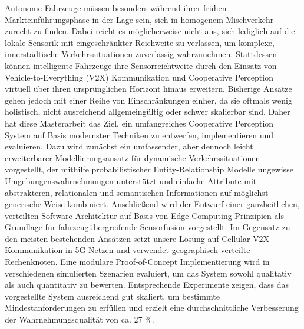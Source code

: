 Autonome Fahrzeuge müssen besonders während ihrer frühen Markteinführungsphase in der Lage sein, sich in homogenem Mischverkehr zurecht zu finden. Dabei reicht es möglicherweise nicht aus, sich lediglich auf die lokale Sensorik mit eingeschränkter Reichweite zu verlassen, um komplexe, innerstädtische Verkehrssituationen zuverlässig wahrzunehmen. Stattdessen können intelligente Fahrzeuge ihre Sensorreichtweite durch den Einsatz von Vehicle-to-Everything (V2X) Kommunikation und Cooperative Perception virtuell über ihren ursprünglichen Horizont hinaus erweitern. Bisherige Ansätze gehen jedoch mit einer Reihe von Einschränkungen einher, da sie oftmals wenig holistisch, nicht ausreichend allgemeingültig oder schwer skalierbar sind. Daher hat diese Masterarbeit das Ziel, ein umfangreiches Cooperative Perception System auf Basis modernster Techniken zu entwerfen, implementieren und evaluieren. Dazu wird zunächst ein umfassender, aber dennoch leicht erweiterbarer Modellierungsansatz für dynamische Verkehrssituationen vorgestellt, der mithilfe probabilistischer Entity-Relationship Modelle ungewisse Umgebungenswahrnehmungen unterstützt und einfache Attribute mit abstrakteren, relationalen und semantischen Informationen auf möglichst generische Weise kombiniert. Anschließend wird der Entwurf einer ganzheitlichen, verteilten Software Architektur auf Basis von Edge Computing-Prinzipien als Grundlage für fahrzeugübergreifende Sensorfusion vorgestellt. Im Gegensatz zu den meisten bestehenden Ansätzen setzt unsere Lösung auf Cellular-V2X Kommunikation in 5G-Netzen und verwendet geographisch verteilte Rechenknoten. Eine modulare Proof-of-Concept Implementierung wird in verschiedenen simulierten Szenarien evaluiert, um das System sowohl qualitativ als auch quantitativ zu bewerten. Entsprechende Experimente zeigen, dass das vorgestellte System ausreichend gut skaliert, um bestimmte Mindestanforderungen zu erfüllen und erzielt eine durchschnittliche Verbesserung der Wahrnehmungsqualität von ca. 27 \%. 